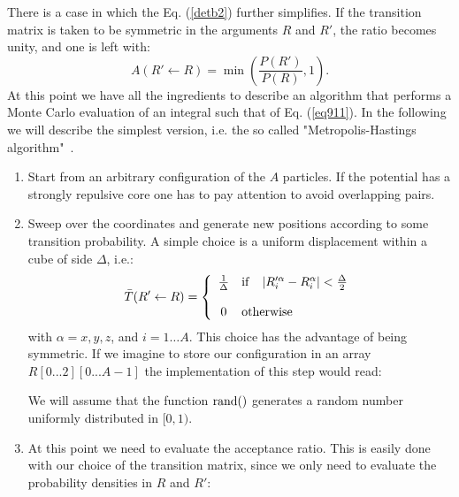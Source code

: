 There is a case in which the Eq. (\ref{detb2}) further simplifies. If the transition matrix is taken to 
be symmetric in the arguments $R$ and $R'$, the ratio becomes unity, and one is left with:
\begin{equation}
A(R'\leftarrow R)=\min\left(\frac{P(R')}{P(R)},1\right).
\label{detb2}
\end{equation} 
At this point we have all the ingredients to describe an algorithm that performs a Monte Carlo evaluation
of an integral such that of Eq. (\ref{eq911}). In the following we will describe the simplest version,
i.e. the so called "Metropolis-Hastings algorithm"~\cite{Metropolis53,Hastings70}. 
\begin{enumerate}
	\item
	Start from an arbitrary configuration of the $A$ particles. If the potential has a strongly repulsive core one has to pay attention to avoid overlapping pairs.
	\item
	Sweep over the coordinates and generate new positions according to some transition probability. A simple choice is a uniform displacement within a cube of side $\Delta$, i.e.:
	\begin{equation}
	  \bar{T}(R'\leftarrow R)=\left\{ 
	  \begin{array}{cl}
	  \frac{1}{\Delta}&{\rm if \ \ \  } |R'^\alpha_i-R^\alpha_i|<\frac{\Delta}{2}\\
	  \\
	  0&{\rm otherwise}
	  \end{array}
	     \right.
	\end{equation}
	with $\alpha =x,y,z$, and $i=1\dots A$. This choice has the advantage of being symmetric. If we imagine
	to store our configuration in an array $R[0...2][0...A-1]$ the implementation of this step would read:
\begin{svgraybox}
	\begin{algorithmic} 
		\EndFor
		\EndFor
	\end{algorithmic}
\end{svgraybox}
    We will assume that the function ${\rm rand}()$ generates a random number uniformly distributed
    in $[0,1)$.
    \item 
    At this point we need to evaluate the acceptance ratio. This is easily done with our choice of the transition matrix, since we only need to evaluate the probability densities in $R$ and $R'$:

\end{enumerate}
